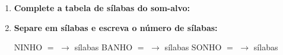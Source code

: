 \begin{exercicio}
\begin{enumerate}[resume]
  \item \textbf{Complete a tabela de sílabas do som-alvo:}

\begin{center}
\end{center}

  \item \textbf{Separe em sílabas e escreva o número de sílabas:}
  \begin{center}
  NINHO $=$ \underline{\hspace{1.2cm}} $\rightarrow$ \underline{\hspace{0.8cm}} sílabas \quad BANHO $=$ \underline{\hspace{1.2cm}} $\rightarrow$ \underline{\hspace{0.8cm}} sílabas \quad SONHO $=$ \underline{\hspace{1.2cm}} $\rightarrow$ \underline{\hspace{0.8cm}} sílabas
  \end{center}

\end{enumerate}

\end{exercicio}



